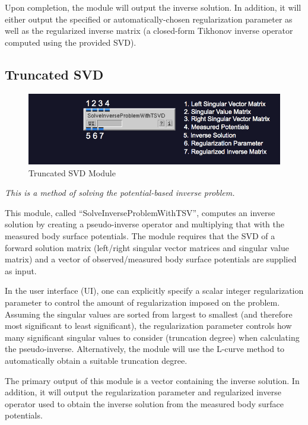 Upon completion, the module will output the inverse solution. In addition, it will either output the specified or automatically-chosen regularization parameter as well as the regularized inverse matrix (a closed-form Tikhonov inverse operator computed using the provided SVD).

\subsection{Truncated SVD}

\begin{figure}[H]
\begin{center}
\includegraphics[width=\textwidth]{ECGToolkitGuide_figures/SolveInverseProblemWithTSVD.png}
\caption{Truncated SVD Module}
\label{tsvd}
\end{center}
\end{figure}

\vspace{5pt}\textit{This is a method of solving the potential-based inverse problem.}\vspace{5pt}

This module, called ``SolveInverseProblemWithTSV'', computes an inverse solution by creating a pseudo-inverse operator and multiplying that with the measured body surface potentials. The module requires that the SVD of a forward solution matrix (left/right singular vector matrices and singular value matrix) and a vector of observed/measured body surface potentials are supplied as input.

In the user interface (UI), one can explicitly specify a scalar integer regularization parameter to control the amount of regularization imposed on the problem. Assuming the singular values are sorted from largest to smallest (and therefore most significant to least significant), the regularization parameter controls how many significant singular values to consider (truncation degree) when calculating the pseudo-inverse. Alternatively, the module will use the L-curve method to automatically obtain a suitable truncation degree.

The primary output of this module is a vector containing the inverse solution. In addition, it will output the regularization parameter and regularized inverse operator used to obtain the inverse solution from the measured body surface potentials.

